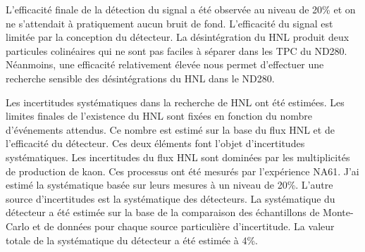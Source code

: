 \documentclass[../main.tex]{subfiles}
\begin{document}
L'efficacité finale de la détection du signal a été observée au niveau de 20\% et on ne s'attendait à pratiquement aucun bruit de fond. L'efficacité du signal est limitée par la conception du détecteur. La désintégration du HNL produit deux particules colinéaires qui ne sont pas faciles à séparer dans les TPC du ND280. Néanmoins, une efficacité relativement élevée nous permet d'effectuer une recherche sensible des désintégrations du HNL dans le ND280.



Les incertitudes systématiques dans la recherche de HNL ont été estimées. Les limites finales de l'existence du HNL sont fixées en fonction du nombre d'événements attendus. Ce nombre est estimé sur la base du flux HNL et de l'efficacité du détecteur. Ces deux éléments font l'objet d'incertitudes systématiques. Les incertitudes du flux HNL sont dominées par les multiplicités de production de kaon. Ces processus ont été mesurés par l'expérience NA61. J'ai estimé la systématique basée sur leurs mesures à un niveau de 20\%. L'autre source d'incertitudes est la systématique des détecteurs. La systématique du détecteur a été estimée sur la base de la comparaison des échantillons de Monte-Carlo et de données pour chaque source particulière d'incertitude. La valeur totale de la systématique du détecteur a été estimée à 4\%.


\end{document}
